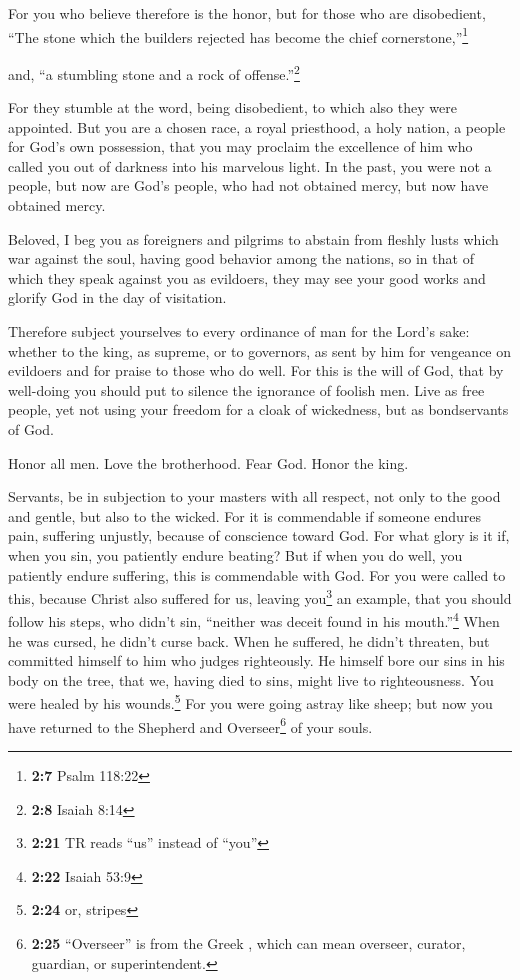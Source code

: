  For you who believe therefore is the honor, but for those
who are disobedient, ``The stone which the builders rejected has become
the chief cornerstone,''\footnote{\textbf{2:7} Psalm 118:22}

 and, ``a stumbling stone and a rock of
offense.''\footnote{\textbf{2:8} Isaiah 8:14}

For they stumble at the word, being disobedient, to which also they were
appointed.  But you are a chosen race, a royal priesthood,
a holy nation, a people for God's own possession, that you may proclaim
the excellence of him who called you out of darkness into his marvelous
light.  In the past, you were not a people, but now are
God's people, who had not obtained mercy, but now have obtained mercy.

 Beloved, I beg you as foreigners and pilgrims to abstain
from fleshly lusts which war against the soul,  having
good behavior among the nations, so in that of which they speak against
you as evildoers, they may see your good works and glorify God in the
day of visitation.

 Therefore subject yourselves to every ordinance of man
for the Lord's sake: whether to the king, as supreme,  or
to governors, as sent by him for vengeance on evildoers and for praise
to those who do well.  For this is the will of God, that
by well-doing you should put to silence the ignorance of foolish men.
 Live as free people, yet not using your freedom for a
cloak of wickedness, but as bondservants of God.

 Honor all men. Love the brotherhood. Fear God. Honor the
king.

 Servants, be in subjection to your masters with all
respect, not only to the good and gentle, but also to the wicked.
 For it is commendable if someone endures pain, suffering
unjustly, because of conscience toward God.  For what
glory is it if, when you sin, you patiently endure beating? But if when
you do well, you patiently endure suffering, this is commendable with
God.  For you were called to this, because Christ also
suffered for us, leaving you\footnote{\textbf{2:21} TR reads ``us''
  instead of ``you''} an example, that you should follow his steps,
 who didn't sin, ``neither was deceit found in his
mouth.''\footnote{\textbf{2:22} Isaiah 53:9}  When he was
cursed, he didn't curse back. When he suffered, he didn't threaten, but
committed himself to him who judges righteously.  He
himself bore our sins in his body on the tree, that we, having died to
sins, might live to righteousness. You were healed by his
wounds.\footnote{\textbf{2:24} or, stripes}  For you were
going astray like sheep; but now you have returned to the Shepherd and
Overseer\footnote{\textbf{2:25} ``Overseer'' is from the Greek
  , which can mean overseer, curator, guardian, or
  superintendent.} of your souls.

